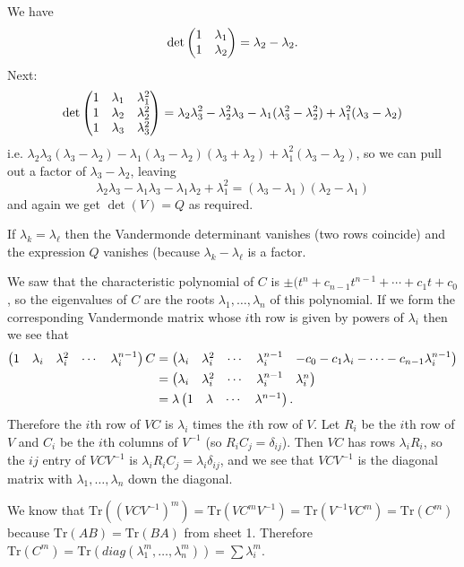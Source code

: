 \documentclass{article}
\begin{document}
\begin{Solution}
We have \[\det\begin{pmatrix} 1 & \lambda_1 \\ 1 &
\lambda_2\end{pmatrix}=\lambda_2-\lambda_2.\] Next: \[\det\begin{pmatrix} 1 & \lambda_1 &
\lambda_1^2 \\ 1 & \lambda_2 & \lambda_2^2 \\ 1 & \lambda_3 &
\lambda_3^2\end{pmatrix}=\lambda_2\lambda_3^2-\lambda_2^2\lambda_3-\lambda_1(\lambda_3^2-\lambda_2^2)+\lambda_1^2(\lambda_3-\lambda_2)\]
i.e. \(\lambda_2\lambda_3(\lambda_3-\lambda_2)-\lambda_1(\lambda_3-\lambda_2)(\lambda_3+\lambda_2)+\lambda_1^2(\lambda_3-\lambda_2)\),
so we can pull out a factor of \(\lambda_3-\lambda_2\), leaving
\[\lambda_2\lambda_3-\lambda_1\lambda_3-\lambda_1\lambda_2+\lambda_1^2=(\lambda_3-\lambda_1)(\lambda_2-\lambda_1)\]
and again we get \(\det(V)=Q\) as required.


If \(\lambda_k=\lambda_{\ell}\) then the Vandermonde determinant
vanishes (two rows coincide) and the expression \(Q\) vanishes
(because \(\lambda_k-\lambda_{\ell}\) is a factor.


\end{Solution}
\begin{Solution}
We saw that the characteristic polynomial of \(C\) is
\(\pm(t^n+c_{n-1}t^{n-1}+\cdots+c_1t+c_0\), so the eigenvalues of
\(C\) are the roots \(\lambda_1,\ldots,\lambda_n\) of this
polynomial. If we form the corresponding Vandermonde matrix whose
\(i\)th row is given by powers of \(\lambda_i\) then we see that
\begin{align*}\begin{pmatrix} 1 & \lambda_i & \lambda_i^2 &\cdots
&\lambda_i^{n-1}\end{pmatrix} C&=\begin{pmatrix} \lambda_i & \lambda_i^2 & \cdots &
\lambda_i^{n-1} &
-c_0-c_1\lambda_i-\cdots-c_{n-1}\lambda_i^{n-1}\end{pmatrix}\\
&=\begin{pmatrix} \lambda_i & \lambda_i^2 & \cdots & \lambda_i^{n-1} &
\lambda_i^n\end{pmatrix}\\
&=\lambda\begin{pmatrix} 1 & \lambda & \cdots &\lambda^{n-1}\end{pmatrix}.\end{align*}
Therefore the \(i\)th row of \(VC\) is \(\lambda_i\) times the
\(i\)th row of \(V\). Let \(R_i\) be the \(i\)th row of \(V\) and
\(C_i\) be the \(i\)th columns of \(V^{-1}\) (so
\(R_iC_j=\delta_{ij}\)). Then \(VC\) has rows \(\lambda_i R_i\), so
the \(ij\) entry of \(VCV^{-1}\) is
\(\lambda_iR_iC_j=\lambda_i\delta_{ij}\), and we see that
\(VCV^{-1}\) is the diagonal matrix with
\(\lambda_1,\ldots,\lambda_n\) down the diagonal.


We know that
\(\mathrm{Tr}((VCV^{-1})^m)=\mathrm{Tr}(VC^mV^{-1})=\mathrm{Tr}(V^{-1}VC^m)=\mathrm{Tr}(C^m)\)
because \(\mathrm{Tr}(AB)=\mathrm{Tr}(BA)\) from sheet 1. Therefore
\(\mathrm{Tr}(C^m)=\mathrm{Tr}(diag(\lambda_1^m,\ldots,\lambda_n^m))=\sum\lambda_i^m\).


\end{Solution}
\end{document}
